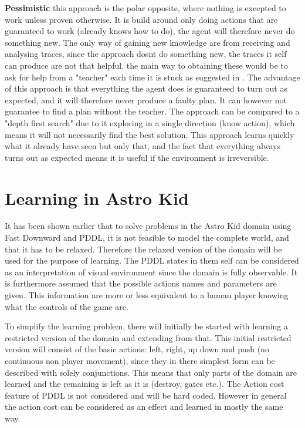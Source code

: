 	\textbf{Pessimistic} this approach is the polar opposite, where nothing is excepted to work unless proven otherwise. It is build around only doing actions that are guaranteed to work (already knows how to do), the agent will therefore never do something new. The only way of gaining new knowledge are from receiving and analysing traces, since the approach dosnt do something new, the traces it self can produce are not that helpful. the main way to obtaining these would be to ask for help from a "teacher" each time it is stuck as suggested in \cite{Action-Schemas}.
	The advantage of this approach is that everything the agent does is guaranteed to turn out as expected, and it will therefore never produce a faulty plan. It can however not guarantee to find a plan without the teacher. The approach can be compared to a "depth first search" due to it exploring in a single direction (know action), which means it will not necessarily find the best solution. 
	This approach learns quickly what it already have seen but only that, and the fact that everything always turns out as expected means it is useful if the environment is irreversible.
	
	

	
		
		
	
	\section{Learning in Astro Kid}
	It has been shown earlier that to solve problems in the Astro Kid domain using Fast Downward and PDDL, it is not feasible to model the complete world, and that it has to be relaxed. Therefore the relaxed version of the domain will be used for the purpose of learning. The PDDL states in them self can be considered as an interpretation of visual environment since the domain is fully observable. It is furthermore assumed that the possible actions names and parameters are given. This information are more or less equivalent to a human player knowing what the controls of the game are. 
	
	
	To simplify the learning problem, there will initially be started with learning a restricted version of the domain and extending from that. This initial restricted version will consist of the basic actions: left, right, up down and push (no continuous non player movement), since they in there simplest form can be described with solely conjunctions. This means that only parts of the domain are learned and the remaining is left as it is (destroy, gates etc.). The Action cost feature of PDDL is not considered and will be hard coded. However in general the action cost can be considered as an effect and learned in mostly the same way.

